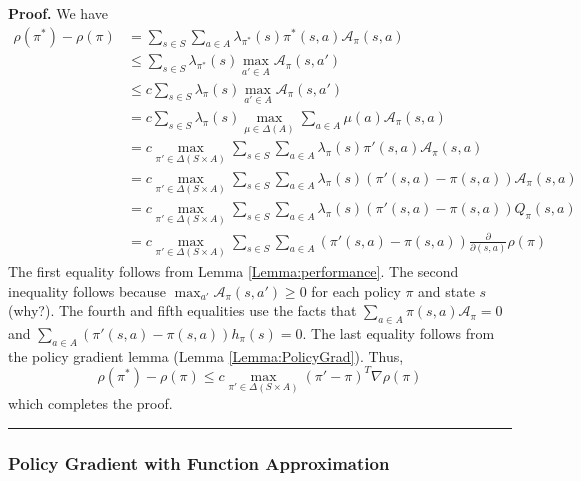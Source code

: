 \documentclass[letter,11pt]{article}
\newenvironment {proof}[1][Proof]{\noindent \textbf {#1.} }{\ \rule {0.5em}{0.5em}}
\begin{document}
     \begin{proof} We have
      \begin{align*}
          \rho(\pi^{*}) - \rho ( \pi) & =  \sum_{s \in S} \sum _{a \in A} \lambda _{\pi^{*} }(s) \pi^{*}(s,a)  \mathcal{A}_{\pi} (s,a)   \\
          & \leq \sum_{s \in S} \lambda _{\pi^{*} }(s) \max _{a' \in A} \mathcal{A}_{\pi} (s,a') \\
         & \leq c  \sum_{s \in S} \lambda _{\pi}(s) \max _{a' \in A} \mathcal{A}_{\pi} (s,a') \\ 
         & =  c  \sum_{s \in S} \lambda _{\pi}(s) \max _{\mu \in \Delta(A)} \sum _{a \in A} \mu(a)  \mathcal{A}_{\pi} (s,a) \\
         & = c \max _{\pi' \in \Delta(S \times A)} \sum_{s \in S}  \sum _{a \in A} \lambda _{\pi}(s)  \pi'(s,a) \mathcal{A}_{\pi} (s,a)\\
        & =  c \max _{\pi' \in \Delta(S \times A)} \sum_{s \in S}  \sum _{a \in A} \lambda _{\pi}(s)  (\pi'(s,a) - \pi(s,a) )\mathcal{A}_{\pi} (s,a)  \\
         & = c \max _{\pi' \in \Delta(S \times A)} \sum_{s \in S}  \sum _{a \in A}  \lambda _{\pi}(s)  (\pi'(s,a) - \pi(s,a) ) Q_{\pi } (s,a) \\
          & = c \max _{\pi' \in \Delta(S \times A)} \sum_{s \in S}  \sum _{a \in A}  (\pi'(s,a) - \pi(s,a) )   \frac{\partial }{\partial (s,a)}\rho (\pi)  
      \end{align*}
 The first equality follows from Lemma \ref{Lemma:performance}. The second inequality follows because $\max_{a'} \mathcal{A}_{\pi} (s,a') \geq 0$ for each policy $\pi$ and state $s$ (why?). The fourth and fifth equalities use the facts that $ \sum _{a \in A} \pi(s,a) \mathcal{A}_{\pi} =0$ and  $\sum _{a \in A}    (\pi'(s,a) - \pi(s,a) ) h_{\pi}(s) = 0$. The last equality follows from the policy gradient lemma (Lemma \ref{Lemma:PolicyGrad}).  Thus, 
 $$\rho(\pi^{*}) - \rho ( \pi) \leq c \max _{\pi' \in \Delta(S \times A)} (\pi' - \pi)^{T} \nabla \rho ( \pi) $$
 which completes the proof. 
           \end{proof}







\subsubsection{Policy Gradient with Function Approximation}
\end{document}
